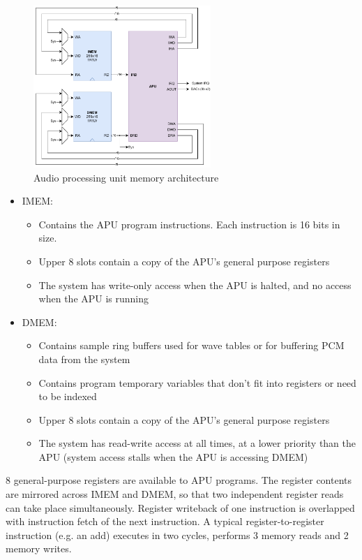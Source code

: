 \begin{figure}[H]
\centering
\caption{Audio processing unit memory architecture}
\label{diagram:ppu_arch}
\includegraphics[width=0.6\textwidth]{diagrams/apu_mem_arch.pdf}
\end{figure}


\begin{itemize}
	\item IMEM:
	\begin{itemize}
		\item Contains the APU program instructions. Each instruction is 16 bits in size.
		\item Upper 8 slots contain a copy of the APU's general purpose registers
		\item The system has write-only access when the APU is halted, and no access when the APU is running
	\end{itemize}
	\item DMEM:
	\begin{itemize}
		\item Contains sample ring buffers used for wave tables or for buffering PCM data from the system
		\item Contains program temporary variables that don't fit into registers or need to be indexed
		\item Upper 8 slots contain a copy of the APU's general purpose registers
		\item The system has read-write access at all times, at a lower priority than the APU (system access stalls when the APU is accessing DMEM)
	\end{itemize}
\end{itemize}

8 general-purpose registers are available to APU programs. The register contents are mirrored across IMEM and DMEM, so that two independent register reads can take place simultaneously. Register writeback of one instruction is overlapped with instruction fetch of the next instruction. A typical register-to-register instruction (e.g. an add) executes in two cycles, performs 3 memory reads and 2 memory writes.

